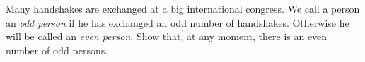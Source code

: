 Many handshakes are exchanged at a big international congress. We call a person an \emph{odd person} if he has exchanged an odd number of handshakes. Otherwise he will be called an \emph{even person}. Show that, at any moment, there is an even number of odd persons.
